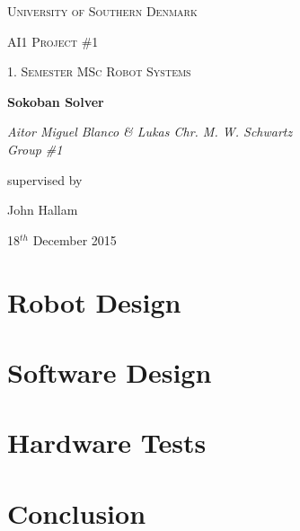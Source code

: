 \documentclass[12pt,a4paper]{article}
\begin{document}
\begin{titlepage}
	\centering
	\vfill
	{\scshape\LARGE University of Southern Denmark\par}
	\vspace{1cm}
	{\scshape\Large AI1 Project \#1\par}
	{\scshape\large 1. Semester MSc Robot Systems\par}
	\vspace{1.5cm}
	{\huge\bfseries Sokoban Solver\par}
	\vspace{2cm}
	{\Large\itshape Aitor Miguel Blanco \& Lukas Chr. M. W. Schwartz \\ Group \#1 \par}
	\vfill
	supervised by\par
	John Hallam

	\vspace{2cm}

	{\large 18$^{th}$ December 2015 \par}
\end{titlepage}

\pagebreak

\tableofcontents

\pagebreak

\listoffigures

\listoftables

\pagebreak



\pagebreak
\section{Robot Design}




\pagebreak
\section{Software Design}








\pagebreak
\section{Hardware Tests}


\pagebreak
\section{Conclusion}

\end{document}
